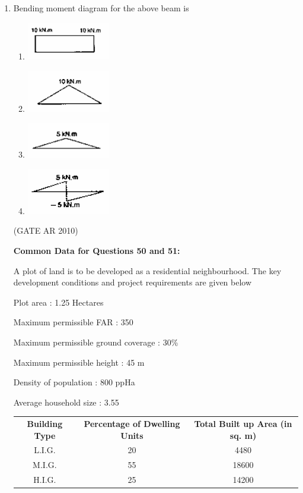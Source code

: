 \documentclass[journal]{IEEEtran}
\begin{document}
\begin{enumerate}
\item Bending moment diagram for the above beam is
\begin{multicols}{2}
\begin{enumerate}
\item \includegraphics[width=0.3\textwidth]{Fig 16.png}
\item \includegraphics[width=0.3\textwidth]{Fig 17.png}
\item \includegraphics[width=0.3\textwidth]{Fig 18.png}
\item \includegraphics[width=0.3\textwidth]{Fig 19.png}
\end{enumerate}
\end{multicols}
\hfill (GATE AR 2010)

\textbf{Common Data for Questions 50 and 51:}

A plot of land is to be developed as a residential neighbourhood. The key development conditions and project requirements are given below

Plot area : 1.25 Hectares

Maximum permissible FAR : 350

Maximum permissible ground coverage : 30\%

Maximum permissible height : 45 m

Density of population : 800 ppHa

Average household size : 3.55

\begin{table}[H]
\centering
\begin{tabular}{ccc}
\textbf{Building Type} &\textbf{Percentage of Dwelling Units} & \textbf{Total Built up Area (in sq. m)} \\
L.I.G. & 20 & 4480 \\
M.I.G. & 55 & 18600 \\
H.I.G. & 25 & 14200 \\
\end{tabular}
\end{table}


\end{enumerate}
\end{document}
